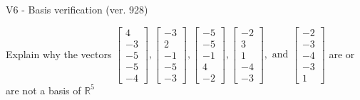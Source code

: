 \begin{exercise}
  \begin{exerciseTitle}V6 - Basis verification (ver. 928)\end{exerciseTitle}
  \begin{exerciseStatement}
    Explain why the vectors \(\left[\begin{array}{r}
4 \\
-3 \\
-5 \\
-5 \\
-4
\end{array}\right] , \left[\begin{array}{r}
-3 \\
2 \\
-1 \\
-5 \\
-3
\end{array}\right] , \left[\begin{array}{r}
-5 \\
-5 \\
-1 \\
4 \\
-2
\end{array}\right] , \left[\begin{array}{r}
-2 \\
3 \\
1 \\
-4 \\
-3
\end{array}\right] , \text{ and } \left[\begin{array}{r}
-2 \\
-3 \\
-4 \\
-3 \\
1
\end{array}\right]\) are or are not a basis of \(\mathbb{R}^5\)	



\end{exerciseStatement}
\end{exercise}
